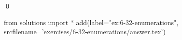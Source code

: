 
\begin{ex}
  \label{ex:6-32-enumerations}
  
  \qed
\end{ex}
\begin{python0}
from solutions import *
add(label="ex:6-32-enumerations",
    srcfilename='exercises/6-32-enumerations/answer.tex')
\end{python0}
